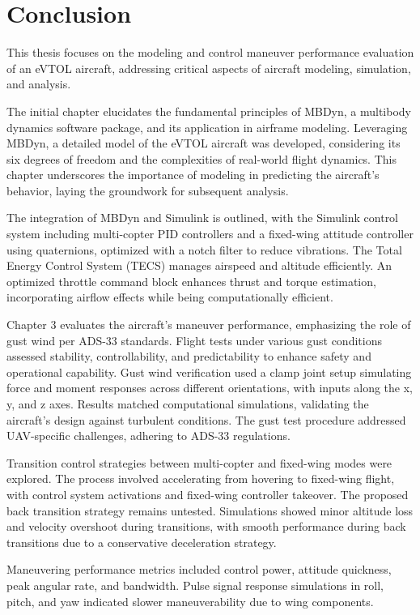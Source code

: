 \chapter{Conclusion}

This thesis focuses on the modeling and control maneuver performance evaluation of an eVTOL aircraft, addressing critical aspects of aircraft modeling, simulation, and analysis.

The initial chapter elucidates the fundamental principles of MBDyn, a multibody dynamics software package, and its application in airframe modeling. Leveraging MBDyn, a detailed model of the eVTOL aircraft was developed, considering its six degrees of freedom and the complexities of real-world flight dynamics. This chapter underscores the importance of modeling in predicting the aircraft's behavior, laying the groundwork for subsequent analysis.

The integration of MBDyn and Simulink is outlined, with the Simulink control system including multi-copter PID controllers and a fixed-wing attitude controller using quaternions, optimized with a notch filter to reduce vibrations. The Total Energy Control System (TECS) manages airspeed and altitude efficiently. An optimized throttle command block enhances thrust and torque estimation, incorporating airflow effects while being computationally efficient.

Chapter 3 evaluates the aircraft's maneuver performance, emphasizing the role of gust wind per ADS-33 standards. Flight tests under various gust conditions assessed stability, controllability, and predictability to enhance safety and operational capability. Gust wind verification used a clamp joint setup simulating force and moment responses across different orientations, with inputs along the x, y, and z axes. Results matched computational simulations, validating the aircraft's design against turbulent conditions. The gust test procedure addressed UAV-specific challenges, adhering to ADS-33 regulations.

Transition control strategies between multi-copter and fixed-wing modes were explored. The process involved accelerating from hovering to fixed-wing flight, with control system activations and fixed-wing controller takeover. The proposed back transition strategy remains untested. Simulations showed minor altitude loss and velocity overshoot during transitions, with smooth performance during back transitions due to a conservative deceleration strategy.

Maneuvering performance metrics included control power, attitude quickness, peak angular rate, and bandwidth. Pulse signal response simulations in roll, pitch, and yaw indicated slower maneuverability due to wing components.

